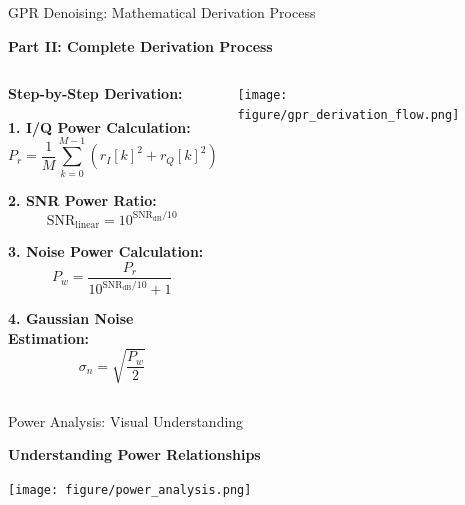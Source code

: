 \documentclass[aspectratio=169]{beamer}
\begin{document}
\begin{frame}{GPR Denoising: Mathematical Derivation Process}
\begin{center}
\textcolor{zjutblue}{\Large \textbf{Part II: Complete Derivation Process}}
\end{center}

\begin{columns}
\begin{column}{0.45\textwidth}
\textbf{Step-by-Step Derivation:}

\vspace{0.2cm}
\textbf{1. I/Q Power Calculation:}
\begin{equation}
P_r = \frac{1}{M}\sum_{k=0}^{M-1}(r_I[k]^2 + r_Q[k]^2)
\end{equation}

\textbf{2. SNR Power Ratio:}
\begin{equation}
\text{SNR}_{\text{linear}} = 10^{\text{SNR}_{\text{dB}}/10}
\end{equation}

\textbf{3. Noise Power Calculation:}
\begin{equation}
P_w = \frac{P_r}{10^{\text{SNR}_{\text{dB}}/10} + 1}
\end{equation}

\textbf{4. Gaussian Noise Estimation:}
\begin{equation}
\sigma_n = \sqrt{\frac{P_w}{2}}
\end{equation}
\end{column}
\begin{column}{0.55\textwidth}
\texttt{[image: figure/gpr\_derivation\_flow.png]}
\end{column}
\end{columns}
\end{frame}

\begin{frame}{Power Analysis: Visual Understanding}
\begin{center}
\textcolor{zjutblue}{\Large \textbf{Understanding Power Relationships}}
\end{center}

\vspace{0.3cm}
\texttt{[image: figure/power\_analysis.png]}

\vspace{0.3cm}
\begin{center}
\end{center}
\end{frame}
\end{document}
